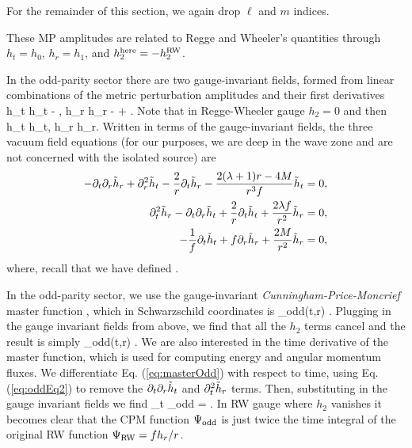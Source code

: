 \documentclass{article}
\begin{document}
For the remainder of this section, we again drop $\ell$ and $m$ 
indices.


These MP amplitudes are related to Regge and Wheeler's quantities through
$ h_{t} = h_0 $,
$ h_{r} = h_1 $,
and 
$ h_{2}^{\rm here} = -h^{\rm RW}_2 $.

In the odd-parity sector there are two gauge-invariant fields, formed 
from linear combinations of the metric perturbation amplitudes and their first derivatives
\cite{MP_2005}
\be
\tilde h_{t} \equiv h_{t} -  ,
\q \q
\tilde h_{r} \equiv h_{r} -   
+ .
\ee
Note that in Regge-Wheeler gauge $h_{2} = 0$ and then
\be
\tilde h_{t} \equiv h_{t},
\q \q
\tilde h_{r} \equiv h_{r}.
\ee
Written in terms of the  gauge-invariant fields, 
the three vacuum field equations 
(for our purposes, we are deep in the wave zone and 
are not concerned with the isolated source) are
\begin{align}
 - \partial_t \partial_r  \tilde h_r + \partial_r^2  \tilde h_t - \frac{2}{r} \partial_t \tilde  h_r 
- \frac{2 (\lambda + 1) r - 4M}{r^3 f}  \tilde h_t &= 0, \\
\label{eq:oddEq2}
\partial_t^2 \tilde  h_r - \partial_t \partial_r  \tilde h_t + \frac{2}{r} \partial_t \tilde  h_t 
+ \frac{2 \lambda f }{r^2} \tilde  h_r &= 0, \\
 -\frac{1}{f} \partial_t \tilde  h_t + f \partial_r \tilde  h_r 
 + \frac{2M}{r^2} \tilde  h_r &= 0 ,
\end{align}
where, recall that we have defined
\be
\la \equiv {}. 
\ee 


In the odd-parity sector, we use the gauge-invariant
\emph{Cunningham-Price-Moncrief} master function \cite{CPM_1978}, which in Schwarzschild coordinates is
\be
\Psi_{\rm odd}(t,r) \equiv {} 
 .
\label{eq:masterOdd}
\ee
Plugging in the gauge invariant fields from above, we find that
all the $h_{2}$ terms cancel and the result is simply
\be
\Psi_{\rm odd}(t,r) \equiv {} 
 .
\ee
We are also interested in the time derivative of the master function,
which is used for computing energy and angular momentum fluxes.
We differentiate Eq. (\ref{eq:masterOdd}) with respect to time, using 
Eq. (\ref{eq:oddEq2}) to remove the $\partial_{t} \partial_{r} \tilde h_{t}$ and
$\partial_{t}^{2} \tilde h_{r}$ terms.
Then, substituting in the gauge invariant fields we find
\be
\pa_{t} \Psi_{\rm odd} = 
 .
\ee
In RW gauge where $h_{2}$ vanishes it becomes clear that 
the CPM function $\Psi_{\rm odd}$ is just twice
the time integral of the original RW function 
$\Psi_{\rm RW} = f h_{r} / r$.
\end{document}
